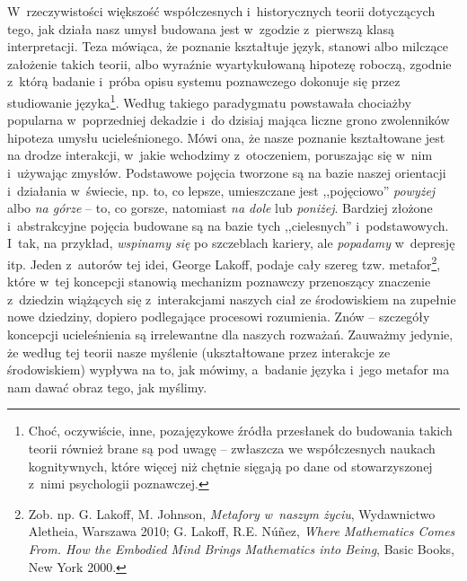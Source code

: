 W~rzeczywistości większość współczesnych i~historycznych teorii dotyczących tego, jak działa nasz umysł budowana jest w~zgodzie z~pierwszą klasą interpretacji. Teza mówiąca, że poznanie kształtuje język, stanowi albo milczące założenie takich teorii, albo wyraźnie wyartykułowaną hipotezę roboczą, zgodnie z~którą badanie i~próba opisu systemu poznawczego dokonuje się przez studiowanie języka\footnote{Choć, oczywiście, inne, pozajęzykowe źródła przesłanek do budowania takich teorii również brane są pod uwagę -- zwłaszcza we współczesnych naukach kognitywnych, które więcej niż chętnie sięgają po dane od stowarzyszonej z~nimi psychologii poznawczej.}. Według takiego paradygmatu powstawała chociażby popularna w~poprzedniej dekadzie i~do dzisiaj mająca liczne grono zwolenników hipoteza umysłu ucieleśnionego. Mówi ona, że nasze poznanie kształtowane jest na drodze interakcji, w~jakie wchodzimy z~otoczeniem, poruszając się w~nim i~używając zmysłów. Podstawowe pojęcia tworzone są na bazie naszej orientacji i~działania w~świecie, np. to, co lepsze, umieszczane jest ,,pojęciowo'' \textit{powyżej} albo \textit{na górze} -- to, co gorsze, natomiast \textit{na dole} lub \textit{poniżej}. Bardziej złożone i~abstrakcyjne pojęcia budowane są na bazie tych ,,cielesnych'' i~podstawowych. I~tak, na przykład, \textit{wspinamy się} po szczeblach kariery, ale \textit{popadamy} w~depresję itp. Jeden z~autorów tej idei, George Lakoff, podaje cały szereg tzw. metafor\footnote{Zob. np. G. Lakoff, M. Johnson, \textit{Metafory w~naszym życiu}, Wydawnictwo Aletheia, Warszawa 2010; G. Lakoff, R.E. Núñez, \textit{Where Mathematics Comes From. How the Embodied Mind Brings Mathematics into Being}, Basic Books, New York 2000.}, które w~tej koncepcji stanowią mechanizm poznawczy przenoszący znaczenie z~dziedzin wiążących się z~interakcjami naszych ciał ze środowiskiem na zupełnie nowe dziedziny, dopiero podlegające procesowi rozumienia. Znów -- szczegóły koncepcji ucieleśnienia są irrelewantne dla naszych rozważań. Zauważmy jedynie, że według tej teorii nasze myślenie (ukształtowane przez interakcje ze środowiskiem) wypływa na to, jak mówimy, a~badanie języka i~jego metafor ma nam dawać obraz tego, jak myślimy.

